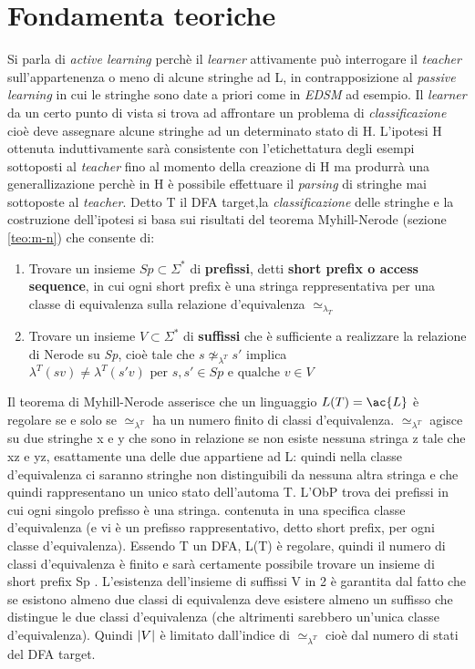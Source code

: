 \section{Fondamenta teoriche}
Si parla di \textit{active learning} perchè il \textit{learner} attivamente può interrogare il \textit{teacher} sull'appartenenza o meno di alcune stringhe ad \ac{L}, in contrapposizione al \textit{passive learning} in cui le stringhe sono date a priori come in \textit{EDSM} ad esempio. Il \textit{learner} da un certo punto di vista si trova ad affrontare un problema di \textit{classificazione} cioè deve assegnare alcune stringhe ad un determinato stato di \ac{H}. L'ipotesi \ac{H}  ottenuta induttivamente sarà consistente con l'etichettatura degli esempi sottoposti al \textit{teacher}  fino al momento della creazione di \ac{H} ma produrrà una generallizazione perchè in \ac{H} è possibile effettuare il \textit{parsing} di stringhe mai sottoposte al \textit{teacher}. Detto T il \ac{DFA} target,la \textit{classificazione} delle stringhe e la costruzione dell'ipotesi si basa sui risultati del teorema Myhill-Nerode (sezione \ref{teo:m-n}) che consente di:
\begin{enumerate}
\item Trovare un insieme $Sp \subset \Sigma^{*}$ di \textbf{prefissi}, detti \textbf{short prefix o access sequence},   in cui ogni short prefix è una stringa reppresentativa per una classe di equivalenza sulla relazione d'equivalenza $\simeq_{\lambda_{T}}$
 \item Trovare un insieme $V \subset \Sigma^{*}$ di \textbf{suffissi} che è sufficiente a realizzare la relazione di Nerode su \textit{Sp}, cioè tale che $s \not\simeq_{\lambda^{T}} s'$ implica $\lambda^{T}(sv) \neq \lambda^{T}(s'v) \text{ per } s,s' \in Sp \text{ e qualche } v \in V$ 
\end{enumerate}
Il teorema di Myhill-Nerode asserisce che un linguaggio $L(T) = \ac{L}$ è regolare se e solo se $\simeq_{\lambda^{T}}$ ha un numero finito di classi d'equivalenza. $\simeq_{\lambda^{T}}$ agisce su due stringhe x e y che sono in relazione se non esiste nessuna stringa z tale che xz e yz, esattamente una delle due appartiene ad \ac{L}: quindi nella classe d'equivalenza ci saranno stringhe non distinguibili da nessuna altra stringa e che quindi rappresentano un unico stato dell'automa T. L'\ac{ObP} trova dei prefissi in cui ogni singolo prefisso è una stringa. contenuta in una specifica classe d'equivalenza (e vi è un prefisso rappresentativo, detto short prefix, per ogni classe d'equivalenza). Essendo T un \ac{DFA}, L(T) è regolare, quindi il numero di classi d'equivalenza è finito e sarà certamente possibile trovare un insieme di short prefix Sp . L'esistenza dell'insieme di suffissi V in 2 è garantita dal fatto che se esistono almeno due classi di equivalenza deve esistere almeno un suffisso che distingue le due classi d'equivalenza (che altrimenti sarebbero un'unica classe d'equivalenza). Quindi $\lvert V\rvert$ è limitato dall'indice di $\simeq_{\lambda^{T}}$ cioè dal numero di stati del \ac{DFA} target.
